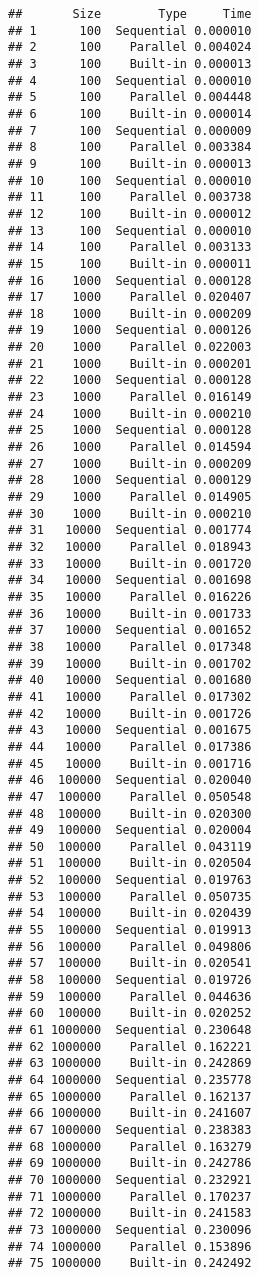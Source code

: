 \documentclass[
]{article}
\begin{document}
\begin{verbatim}
##       Size        Type     Time
## 1      100  Sequential 0.000010
## 2      100    Parallel 0.004024
## 3      100    Built-in 0.000013
## 4      100  Sequential 0.000010
## 5      100    Parallel 0.004448
## 6      100    Built-in 0.000014
## 7      100  Sequential 0.000009
## 8      100    Parallel 0.003384
## 9      100    Built-in 0.000013
## 10     100  Sequential 0.000010
## 11     100    Parallel 0.003738
## 12     100    Built-in 0.000012
## 13     100  Sequential 0.000010
## 14     100    Parallel 0.003133
## 15     100    Built-in 0.000011
## 16    1000  Sequential 0.000128
## 17    1000    Parallel 0.020407
## 18    1000    Built-in 0.000209
## 19    1000  Sequential 0.000126
## 20    1000    Parallel 0.022003
## 21    1000    Built-in 0.000201
## 22    1000  Sequential 0.000128
## 23    1000    Parallel 0.016149
## 24    1000    Built-in 0.000210
## 25    1000  Sequential 0.000128
## 26    1000    Parallel 0.014594
## 27    1000    Built-in 0.000209
## 28    1000  Sequential 0.000129
## 29    1000    Parallel 0.014905
## 30    1000    Built-in 0.000210
## 31   10000  Sequential 0.001774
## 32   10000    Parallel 0.018943
## 33   10000    Built-in 0.001720
## 34   10000  Sequential 0.001698
## 35   10000    Parallel 0.016226
## 36   10000    Built-in 0.001733
## 37   10000  Sequential 0.001652
## 38   10000    Parallel 0.017348
## 39   10000    Built-in 0.001702
## 40   10000  Sequential 0.001680
## 41   10000    Parallel 0.017302
## 42   10000    Built-in 0.001726
## 43   10000  Sequential 0.001675
## 44   10000    Parallel 0.017386
## 45   10000    Built-in 0.001716
## 46  100000  Sequential 0.020040
## 47  100000    Parallel 0.050548
## 48  100000    Built-in 0.020300
## 49  100000  Sequential 0.020004
## 50  100000    Parallel 0.043119
## 51  100000    Built-in 0.020504
## 52  100000  Sequential 0.019763
## 53  100000    Parallel 0.050735
## 54  100000    Built-in 0.020439
## 55  100000  Sequential 0.019913
## 56  100000    Parallel 0.049806
## 57  100000    Built-in 0.020541
## 58  100000  Sequential 0.019726
## 59  100000    Parallel 0.044636
## 60  100000    Built-in 0.020252
## 61 1000000  Sequential 0.230648
## 62 1000000    Parallel 0.162221
## 63 1000000    Built-in 0.242869
## 64 1000000  Sequential 0.235778
## 65 1000000    Parallel 0.162137
## 66 1000000    Built-in 0.241607
## 67 1000000  Sequential 0.238383
## 68 1000000    Parallel 0.163279
## 69 1000000    Built-in 0.242786
## 70 1000000  Sequential 0.232921
## 71 1000000    Parallel 0.170237
## 72 1000000    Built-in 0.241583
## 73 1000000  Sequential 0.230096
## 74 1000000    Parallel 0.153896
## 75 1000000    Built-in 0.242492
\end{verbatim}
\end{document}
